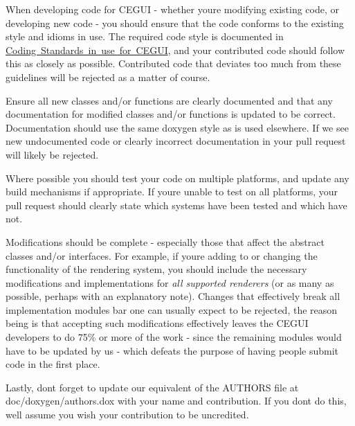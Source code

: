 \begin{DoxyItemize}
\item When developing code for C\+E\+G\+UI -\/ whether you\textquotesingle{}re modifying existing code, or developing new code -\/ you should ensure that the code conforms to the existing style and idioms in use. The required code style is documented in \mbox{\hyperlink{code_standards}{Coding Standards in use for C\+E\+G\+UI}}, and your contributed code should follow this as closely as possible. Contributed code that deviates too much from these guidelines will be rejected as a matter of course.
\item Ensure all new classes and/or functions are clearly documented and that any documentation for modified classes and/or functions is updated to be correct. Documentation should use the same doxygen style as is used elsewhere. If we see new undocumented code or clearly incorrect documentation in your pull request will likely be rejected.
\item Where possible you should test your code on multiple platforms, and update any build mechanisms if appropriate. If you\textquotesingle{}re unable to test on all platforms, your pull request should clearly state which systems have been tested and which have not.
\item Modifications should be complete -\/ especially those that affect the abstract classes and/or interfaces. For example, if you\textquotesingle{}re adding to or changing the functionality of the rendering system, you should include the necessary modifications and implementations for {\itshape all supported renderers} (or as many as possible, perhaps with an explanatory note). Changes that effectively break all implementation modules bar one can usually expect to be rejected, the reason being is that accepting such modifications effectively leaves the C\+E\+G\+UI developers to do 75\% or more of the work -\/ since the remaining modules would have to be updated by us -\/ which defeats the purpose of having people submit code in the first place.
\item Lastly, don\textquotesingle{}t forget to update our equivalent of the A\+U\+T\+H\+O\+RS file at {\ttfamily doc/doxygen/authors.\+dox} with your name and contribution. If you don\textquotesingle{}t do this, we\textquotesingle{}ll assume you wish your contribution to be uncredited. 
\end{DoxyItemize}